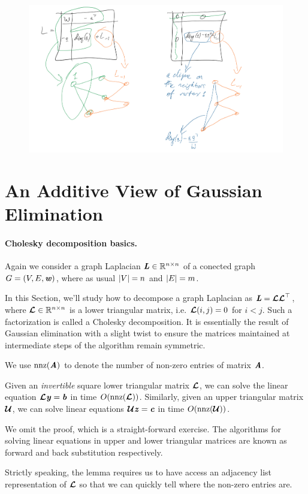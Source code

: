 \begin{figure}[h]
  \centering
  \includegraphics[width=1
  \textwidth]{fig/lecture7_schur-clique.jpeg}
\label{fig:schurclique}
\end{figure}

\section{An Additive View of Gaussian Elimination}

\paragraph{Cholesky decomposition basics.}  Again we consider a graph Laplacian $\LL
\in \R^{n \times n}$ of a conected graph $G = (V,E,\ww)$, where as usual
$\abs{V} = n$ and $\abs{E} = m$.

In this Section, we'll study how to decompose a graph Laplacian as $\LL = \matlow \matlow^\trp$, where $\matlow \in \R^{n \times n}$
is a lower triangular matrix, i.e.
$\matlow(i,j) = 0$ for $i < j$.
Such a factorization is called a Cholesky
decomposition. It is essentially the result of Gaussian elimination with a slight twist
to ensure the matrices maintained at intermediate steps of the
algorithm remain symmetric.

We use $\nnz(\AA)$ to denote the number of non-zero entries of matrix $\AA$.
\begin{lemma}
Given an \emph{invertible} square lower triangular matrix $\matlow$,
we can solve the linear equation $\matlow \yy = \bb$ in time
$O(\nnz(\matlow))$.
Similarly, given an upper triangular matrix $\matup$, we can solve
linear equations $\matup \zz = \cc$ in time $O(\nnz(\matup))$.
\end{lemma}
We omit the proof, which is a straight-forward exercise.
The algorithms for solving linear equations in upper and lower
triangular matrices are known as forward and back substitution respectively.
\begin{remark}
  Strictly speaking, the lemma requires us to have access an adjacency
  list representation of $\matlow$ so that we can quickly tell where
  the non-zero entries are.
\end{remark}

